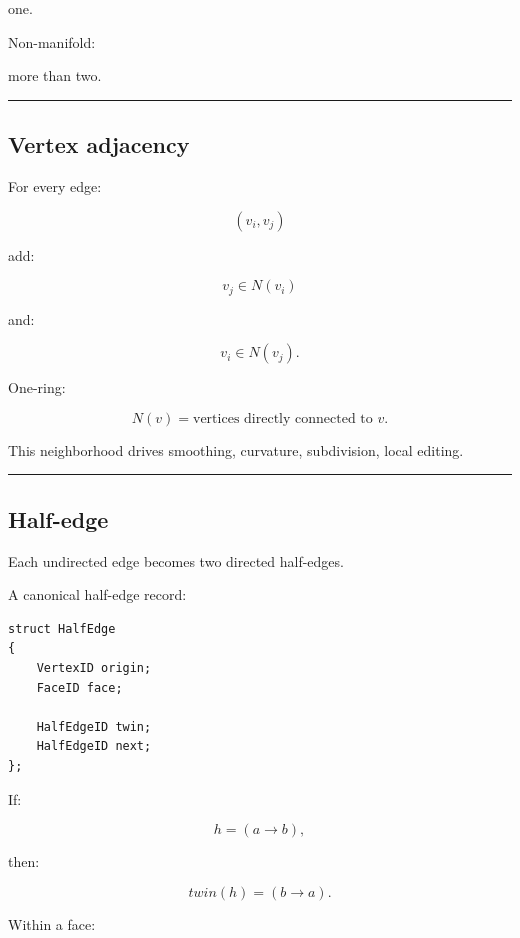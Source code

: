 one.

Non-manifold:

more than two.

\begin{center}\rule{0.5\linewidth}{0.5pt}\end{center}

\subsection{Vertex adjacency}\label{04-visual-computing-ii-ch041-vertex-adjacency}

\hypertarget{04-visual-computing-ii-ch041-vertex-adjacency}{}

For every edge:

\[
(v_i,v_j)
\]

add:

\[
v_j\in N(v_i)
\]

and:

\[
v_i\in N(v_j).
\]

One-ring:

\[
\boxed{
N(v)
=
\text{vertices directly connected to }v.
}
\]

This neighborhood drives smoothing, curvature, subdivision, local editing.

\begin{center}\rule{0.5\linewidth}{0.5pt}\end{center}

\subsection{Half-edge}\label{04-visual-computing-ii-ch041-half-edge}

\hypertarget{04-visual-computing-ii-ch041-half-edge}{}

Each undirected edge becomes two directed half-edges.

A canonical half-edge record:

\begin{verbatim}
struct HalfEdge
{
    VertexID origin;
    FaceID face;

    HalfEdgeID twin;
    HalfEdgeID next;
};
\end{verbatim}

If:

\[
h=(a\rightarrow b),
\]

then:

\[
twin(h)
=
(b\rightarrow a).
\]

Within a face:

